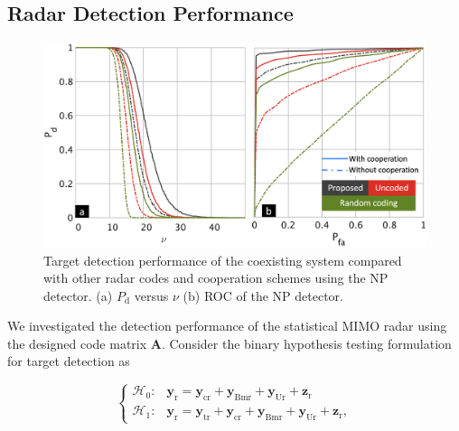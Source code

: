 \documentclass[9pt,journal]{IEEEtran}
\theoremstyle{definition}
\begin{document}
\subsection{Radar Detection Performance}
\begin{figure}[t]
\centering
\includegraphics[width=1.0\columnwidth]{NPdetector.png}
\caption{Target detection performance of the coexisting system compared with other radar codes and cooperation schemes using the NP detector. (a) $\mathit{P}_{\textrm{d}}$ versus $\nu$ (b) ROC of the NP detector.}
\label{fig: NPdetector}
\vspace{-1em}
\end{figure}
We investigated the detection performance of the statistical MIMO radar using the designed code matrix $\mathbf{A}$. %
Consider the binary hypothesis testing formulation for target detection as
\par\noindent\small
\begin{equation}
\label{eq: hypothesis}
\begin{cases}
\mathcal{H}_{\mathrm{0}}: & \mathbf{y}_{\textrm{r}} = \mathbf{y}_{\textrm{cr}}+\mathbf{y}_{\textrm{Bmr}}+\mathbf{y}_{\textrm{Ur}}+\mathbf{z}_{\textrm{r}}
\\
\mathcal{H}_{\mathrm{1}}: & \mathbf{y}_{\mathrm{r}} = \mathbf{y}_{\textrm{tr}}+ \mathbf{y}_{\textrm{cr}}+\mathbf{y}_{\textrm{Bmr}}+\mathbf{y}_{\textrm{Ur}}+\mathbf{z}_{\textrm{r}},
\end{cases}
\end{equation}
\end{document}
